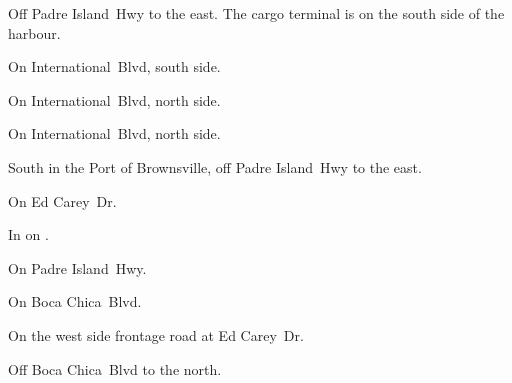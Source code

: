 
\begin{LocationList}

Off  Padre Island~Hwy to the east.
The cargo terminal is on the south side of the harbour.

On  International~Blvd, south side.

On  International~Blvd, north side.

On  International~Blvd, north side.

South in the Port of Brownsville, off  Padre Island~Hwy to the east.

On  Ed Carey~Dr.

In  on .

On  Padre Island~Hwy.

\Location{\TruckService \Service}
On  Boca Chica~Blvd.

\Location{\TruckStop \Gas \Rest}
On the west side  frontage road at  Ed Carey~Dr.

Off  Boca Chica~Blvd to the north.

\end{LocationList}
